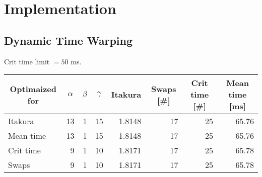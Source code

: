 \chapter{Implementation} %
\label{cha:implementation}


\section{Dynamic Time Warping} %
\label{imp:dynamic_time_warping}

Crit time limit $=50$ ms.

\begin{table}[htbp]
	\begin{center}
		\begin{tabular}{l|rrr|rrrr}
			\toprule
			\multicolumn{1}{c}{Optimaized for} & \multicolumn{1}{c}{$\alpha$} & \multicolumn{1}{c}{$\beta$} & \multicolumn{1}{c}{$\gamma$} & \multicolumn{1}{c}{Itakura} & \multicolumn{1}{c}{Swaps [\#]} & \multicolumn{1}{c}{Crit time [\#]} & \multicolumn{1}{c}{Mean time [ms]}\\
			\midrule
			Itakura & 13 & 1 & 15 & 1.8148 & 17 & 25 & 65.76\\
			Mean time & 13 & 1 & 15 & 1.8148 & 17 & 25 & 65.76\\
			Crit time & 9 & 1 & 10 & 1.8171 & 17 & 25 & 65.78\\
			Swaps & 9 & 1 & 10 & 1.8171 & 17 & 25 & 65.78\\
			\bottomrule			
		\end{tabular}		
	\end{center}
\label{tab:local_constraints}	
\end{table}

